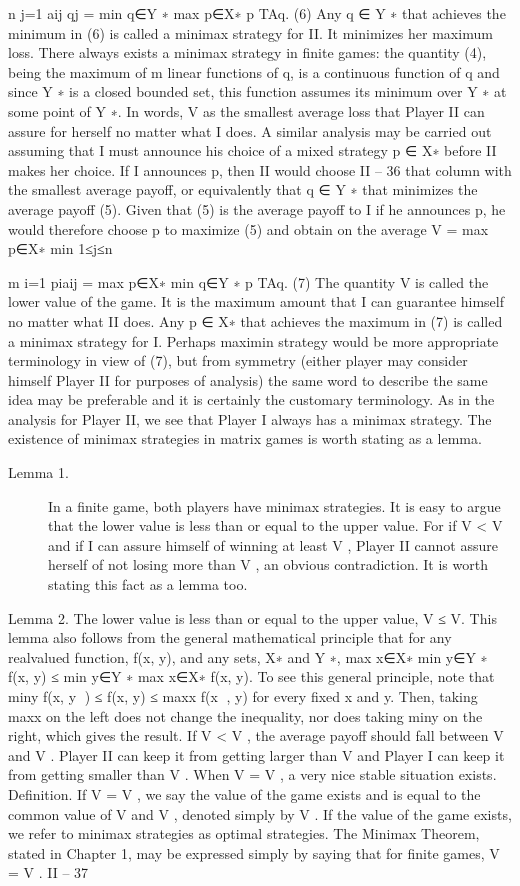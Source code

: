 \documentclass[]{report}
\begin{document}
n
j=1
aij qj = min
q∈Y ∗ max
p∈X∗ p
TAq. (6)
Any q ∈ Y ∗ that achieves the minimum in (6) is called a minimax strategy for II. It
minimizes her maximum loss. There always exists a minimax strategy in finite games: the
quantity (4), being the maximum of m linear functions of q, is a continuous function of q
and since Y ∗ is a closed bounded set, this function assumes its minimum over Y ∗ at some
point of Y ∗.
In words, V as the smallest average loss that Player II can assure for herself no matter
what I does.
A similar analysis may be carried out assuming that I must announce his choice of a
mixed strategy p ∈ X∗ before II makes her choice. If I announces p, then II would choose
II – 36
that column with the smallest average payoff, or equivalently that q ∈ Y ∗ that minimizes
the average payoff (5). Given that (5) is the average payoff to I if he announces p, he
would therefore choose p to maximize (5) and obtain on the average
V = max
p∈X∗ min
1≤j≤n

m
i=1
piaij = max
p∈X∗ min
q∈Y ∗ p
TAq. (7)
The quantity V is called the lower value of the game. It is the maximum amount that I can
guarantee himself no matter what II does. Any p ∈ X∗ that achieves the maximum in (7)
is called a minimax strategy for I. Perhaps maximin strategy would be more appropriate
terminology in view of (7), but from symmetry (either player may consider himself Player
II for purposes of analysis) the same word to describe the same idea may be preferable
and it is certainly the customary terminology. As in the analysis for Player II, we see that
Player I always has a minimax strategy. The existence of minimax strategies in matrix
games is worth stating as a lemma.

\begin{description}
\item[Lemma 1.] In a finite game, both players have minimax strategies.
It is easy to argue that the lower value is less than or equal to the upper value. For if
V < V and if I can assure himself of winning at least V , Player II cannot assure herself of
not losing more than V , an obvious contradiction. It is worth stating this fact as a lemma
too.
\end{description}
Lemma 2. The lower value is less than or equal to the upper value,
V ≤ V.
This lemma also follows from the general mathematical principle that for any realvalued
function, f(x, y), and any sets, X∗ and Y ∗,
max
x∈X∗ min
y∈Y ∗ f(x, y) ≤ min
y∈Y ∗ max
x∈X∗ f(x, y).
To see this general principle, note that miny f(x, y
) ≤ f(x, y) ≤ maxx f(x
, y) for every
fixed x and y. Then, taking maxx on the left does not change the inequality, nor does
taking miny on the right, which gives the result.
If V < V , the average payoff should fall between V and V . Player II can keep it from
getting larger than V and Player I can keep it from getting smaller than V . When V = V ,
a very nice stable situation exists.
Definition. If V = V , we say the value of the game exists and is equal to the common
value of V and V , denoted simply by V . If the value of the game exists, we refer to
minimax strategies as optimal strategies.
The Minimax Theorem, stated in Chapter 1, may be expressed simply by saying that
for finite games, V = V .
II – 37
\end{document}
